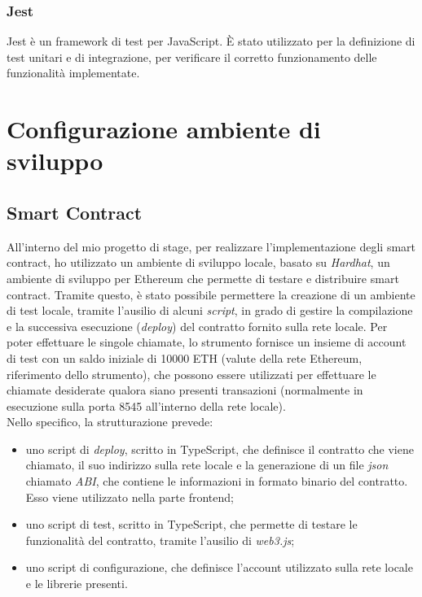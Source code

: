 \subsubsection{Jest}
Jest è un framework di test per JavaScript. È stato utilizzato per la definizione di test unitari e di integrazione, per verificare il corretto funzionamento
delle funzionalità implementate. 

\section{Configurazione ambiente di sviluppo}\label{sec:configurazione-ambiente}

\subsection{Smart Contract}
All'interno del mio progetto di stage, per realizzare l'implementazione degli smart contract, ho utilizzato un ambiente di sviluppo locale,
basato su \textit{Hardhat}, un ambiente di sviluppo per Ethereum che permette di testare e distribuire smart contract.
Tramite questo, è stato possibile permettere la creazione di un ambiente di test locale, tramite l'ausilio di alcuni \textit{script}, in
grado di gestire la compilazione e la successiva esecuzione (\textit{deploy}) del contratto fornito sulla rete locale.
Per poter effettuare le singole chiamate, lo strumento fornisce un insieme di account di test con un saldo iniziale di 10000 ETH (valute della rete Ethereum, riferimento dello strumento), 
che possono essere utilizzati per effettuare le chiamate desiderate qualora siano presenti transazioni (normalmente in esecuzione sulla porta 8545 all'interno della rete locale). \\

Nello specifico, la strutturazione prevede:
\begin{itemize}
    \item uno script di \textit{deploy}, scritto in TypeScript, che definisce il contratto che viene chiamato, il suo indirizzo sulla rete locale
    e la generazione di un file \textit{json} chiamato \textit{ABI}, che contiene le informazioni in formato binario del contratto. Esso viene utilizzato nella parte frontend;
    \item uno script di test, scritto in TypeScript, che permette di testare le funzionalità del contratto, tramite l'ausilio di \textit{web3.js};
    \item uno script di configurazione, che definisce l'account utilizzato sulla rete locale e le librerie presenti.
\end{itemize}

